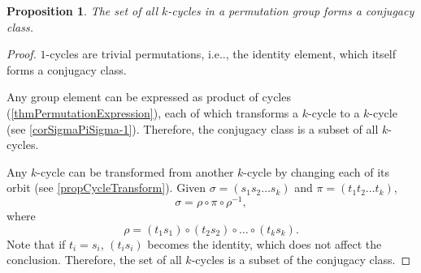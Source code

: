\documentclass[12pt, letterpaper]{article}
\makeatletter
\newcommand\ie{i.e\@ifnextchar.{}{.\@}}
\newtheorem{prop}{Proposition}[section]
\theoremstyle{definition}
\theoremstyle{remark}
\theoremstyle{definition}
\theoremstyle{plain}
\numberwithin{equation}{section}
\makeatother
\begin{document}
	
	\begin{center}
	\end{center}
	\begin{prop}
		The set of all $k$-cycles in a permutation group forms a conjugacy class.
	\end{prop}
	\begin{proof}
		$1$-cycles are trivial permutations, \ie, the identity element,
		which itself forms a conjugacy class.
		
		Any group element can be expressed as product of cycles (\autoref{thmPermutationExpression}),
		each of which transforms a $k$-cycle to a $k$-cycle (see \autoref{corSigmaPiSigma-1}).
		Therefore, the conjugacy class is a subset of all $k$-cycles.
		
		Any $k$-cycle can be transformed from another $k$-cycle by changing
		each of its orbit (see \autoref{propCycleTransform}).
		Given $\sigma=(s_1s_2\dots s_k)$ and $\pi=(t_1t_2\dots t_k)$,
		\[\sigma=\rho\circ\pi\circ\rho^{-1},\]
		where
		\[\rho=(t_1s_1)\circ(t_2s_2)\circ\dots\circ(t_ks_k).\]
		Note that if $t_i=s_i$, $(t_is_i)$ becomes the identity, which does not affect the conclusion.
		Therefore, the set of all $k$-cycles is a subset of the conjugacy class.
	\end{proof}
\end{document}
